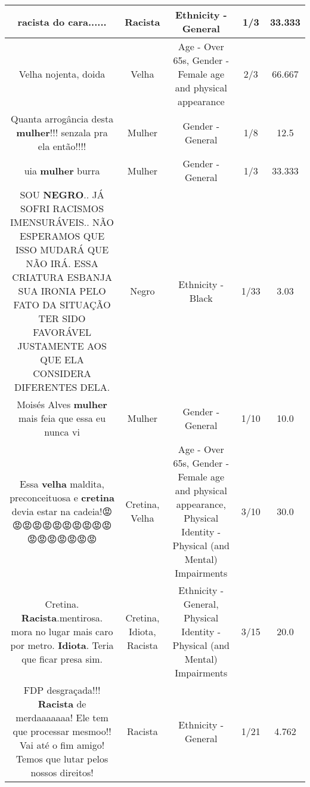 \documentclass[11pt]{article}
\newlength\mylength
\begin{document}
\begin{center}
\begin{longtable}{|C{.65\mylength}|C{.30\mylength}|C{.12\mylength}|C{.12\mylength}|C{.12\mylength}|}
  \small racista do cara......\normalsize   & Racista & Ethnicity - General & 1/3 & 33.333 \\  \hline
  \small Velha nojenta, doida\normalsize   & Velha & Age - Over 65s, Gender - Female age and physical appearance & 2/3 & 66.667 \\  \hline
  \small Quanta arrogância desta \textbf{mulher}!!!  senzala pra ela    então!!!!\normalsize   & Mulher & Gender - General & 1/8 & 12.5 \\  \hline
  \small uia \textbf{mulher} burra\normalsize   & Mulher & Gender - General & 1/3 & 33.333 \\  \hline
  \small SOU \textbf{NEGRO}.. JÁ SOFRI RACISMOS IMENSURÁVEIS.. NÃO ESPERAMOS QUE ISSO MUDARÁ QUE NÃO IRÁ. ESSA CRIATURA ESBANJA SUA IRONIA PELO FATO DA SITUAÇÃO TER SIDO FAVORÁVEL JUSTAMENTE AOS QUE ELA CONSIDERA DIFERENTES DELA.\normalsize   & Negro & Ethnicity - Black & 1/33 & 3.03 \\  \hline
  \small Moisés Alves \textbf{mulher} mais feia que essa eu nunca vi\normalsize   & Mulher & Gender - General & 1/10 & 10.0 \\  \hline
  \small Essa \textbf{v\textbf{elha}} maldita, preconceituosa e \textbf{cretina} devia estar na cadeia!😡😡😡😡😡😡😡😡😡😡😡😡😡😡😡😡😡😡\normalsize   & Cretina, Velha & Age - Over 65s, Gender - Female age and physical appearance, Physical Identity - Physical (and Mental) Impairments & 3/10 & 30.0 \\  \hline
  \small Cretina. \textbf{Racista}.mentirosa. mora no lugar mais caro por metro. \textbf{Idiota}. Teria que ficar presa sim.\normalsize   & Cretina, Idiota, Racista & Ethnicity - General, Physical Identity - Physical (and Mental) Impairments & 3/15 & 20.0 \\  \hline
  \small FDP desgraçada!!! \textbf{Racista} de merdaaaaaaa! Ele tem que processar mesmoo!! Vai até o fim amigo! Temos que lutar pelos nossos direitos!\normalsize   & Racista & Ethnicity - General & 1/21 & 4.762 \\  \hline

\end{longtable}
\end{center}
\end{document}
